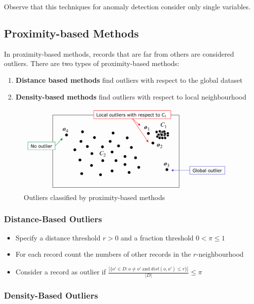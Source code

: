\documentclass[a4paper, 11pt]{article}
\begin{document}
Observe that this techniques for anomaly detection consider only single variables.

\subsection{Proximity-based Methods}

In proximity-based methods, records that are far from others are considered outliers. There are two types of proximity-based methods:
\begin{enumerate}
    \item \textbf{Distance based methods} find outliers with respect to the global dataset
    \item \textbf{Density-based methods} find outliers with respect to local neighbourhood
\end{enumerate}

\begin{figure}[tbh!]
    \centering
    \includegraphics[width=0.8\linewidth, keepaspectratio]{Pictures/outlier_proximity-based}
    \caption{Outliers classified by proximity-based methods}
    \label{fig:outlierproximity-based}
\end{figure}

\subsubsection{Distance-Based Outliers}

\begin{itemize}
    \item Specify a distance threshold $r>0$ and a fraction threshold $0<\pi\leq 1$
    \item For each record count the numbers of other records in the $r$-neighbourhood
    \item Consider a record as outlier if $\frac{|\{o'\in D: o \neq o'\ \text{and}\ dist(o,o')\leq r \}|}{|D|} \leq\pi$
\end{itemize}

\subsubsection{Density-Based Outliers}
\end{document}
